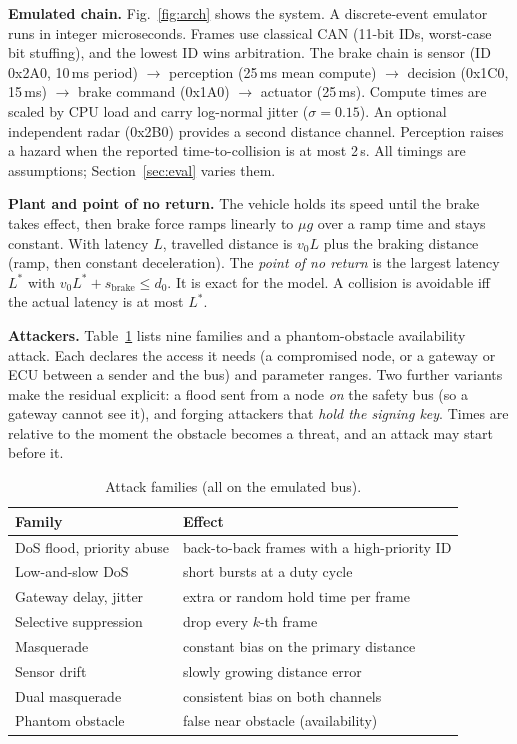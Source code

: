 \documentclass[conference]{IEEEtran}
\begin{document}
\textbf{Emulated chain.} Fig.~\ref{fig:arch} shows the system. A discrete-event emulator runs in integer microseconds. Frames use classical CAN (11-bit IDs, worst-case bit stuffing), and the lowest ID wins arbitration. The brake chain is sensor (ID 0x2A0, 10\,ms period) $\rightarrow$ perception (25\,ms mean compute) $\rightarrow$ decision (0x1C0, 15\,ms) $\rightarrow$ brake command (0x1A0) $\rightarrow$ actuator (25\,ms). Compute times are scaled by CPU load and carry log-normal jitter ($\sigma=0.15$). An optional independent radar (0x2B0) provides a second distance channel. Perception raises a hazard when the reported time-to-collision is at most 2\,s. All timings are assumptions; Section~\ref{sec:eval} varies them.

\textbf{Plant and point of no return.} The vehicle holds its speed until the brake takes effect, then brake force ramps linearly to $\mu g$ over a ramp time and stays constant. With latency $L$, travelled distance is $v_0L$ plus the braking distance (ramp, then constant deceleration). The \emph{point of no return} is the largest latency $L^\ast$ with $v_0L^\ast+s_{\text{brake}}\le d_0$. It is exact for the model. A collision is avoidable iff the actual latency is at most $L^\ast$.

\textbf{Attackers.} Table~\ref{tab:attacks} lists nine families and a phantom-obstacle availability attack. Each declares the access it needs (a compromised node, or a gateway or ECU between a sender and the bus) and parameter ranges. Two further variants make the residual explicit: a flood sent from a node \emph{on} the safety bus (so a gateway cannot see it), and forging attackers that \emph{hold the signing key}. Times are relative to the moment the obstacle becomes a threat, and an attack may start before it.

\begin{table}[t]
\caption{Attack families (all on the emulated bus).}
\label{tab:attacks}
\centering
\footnotesize
\begin{tabular}{@{}p{}p{}@{}}
\toprule
Family & Effect \\
\midrule
DoS flood, priority abuse & back-to-back frames with a high-priority ID \\
Low-and-slow DoS & short bursts at a duty cycle \\
Gateway delay, jitter & extra or random hold time per frame \\
Selective suppression & drop every $k$-th frame \\
Masquerade & constant bias on the primary distance \\
Sensor drift & slowly growing distance error \\
Dual masquerade & consistent bias on both channels \\
Phantom obstacle & false near obstacle (availability) \\
\bottomrule
\end{tabular}
\end{table}
\end{document}
